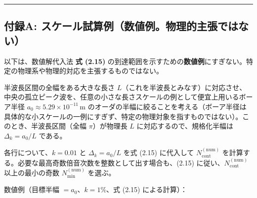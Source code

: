 \documentclass[
]{ltjsarticle}
\begin{document}
\begin{center}\rule{0.5\linewidth}{0.5pt}\end{center}

\subsection{付録A:
スケール試算例（数値例。物理的主張ではない）}\label{ux4ed8ux9332a-ux30b9ux30b1ux30fcux30ebux8a66ux7b97ux4f8bux6570ux5024ux4f8bux7269ux7406ux7684ux4e3bux5f35ux3067ux306fux306aux3044}

以下は、数値解代入法 \textbf{式 (2.15)}
の到達範囲を示すための\textbf{数値例}にすぎない。特定の物理系や物理的対応を主張するものではない。

半波長区間の全幅をある大きな長さ
\(L\)（これを半波長とみなす）に対応させ、中央の孤立ピーク波を、任意の小さな長さスケールの例として便宜上用いるボーア半径
\(a_0\approx5.29\times10^{-11}\,\mathrm{m}\)
のオーダの半幅に絞ることを考える（ボーア半径は具体的な小スケールの一例にすぎず、特定の物理対象を指すものではない）。このとき、半波長区間（全幅
\(\pi\)）が物理長 \(L\) に対応するので、規格化半幅は \(\Delta_k=a_0/L\)
である。

各行について、\(k=0.01\) と \(\Delta_k=a_0/L\) を式 (2.15) に代入して
\(N_{\mathrm{cont}}^{(\mathrm{num})}\)
を計算する。必要な最高奇数倍音次数を整数として出す場合も、(2.15)
に従い、\(N_{\mathrm{cont}}^{(\mathrm{num})}\) 以上の最小の奇数
\(N_{\min}^{(\mathrm{num})}\) を選ぶ。

数値例（目標半幅 \(=a_0\)、\(k=1\%\)、式 (2.15) による計算）：
\end{document}
